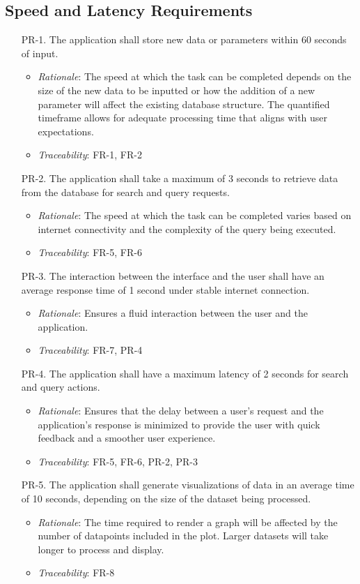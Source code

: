 \documentclass[12pt]{article}
\begin{document}
\subsection{Speed and Latency Requirements}
\begin{enumerate}
\item[PR-1.] The application shall store new data or parameters within 60 seconds of input.
  \begin{itemize}
    \item \textit{Rationale}: The speed at which the task can be completed depends on the size of the new data to be inputted or how the addition of a new parameter will affect the existing database structure. The quantified timeframe allows for adequate processing time that aligns with user expectations.
    \item \textit{Traceability}: FR-1, FR-2
  \end{itemize}
\item[PR-2.] The application shall take a maximum of 3 seconds to retrieve data from the database for search and query requests.
  \begin{itemize}
    \item \textit{Rationale}: The speed at which the task can be completed varies based on internet connectivity and the complexity of the query being executed.
    \item \textit{Traceability}: FR-5, FR-6
  \end{itemize}
\item[PR-3.] The interaction between the interface and the user shall have an average response time of 1 second under stable internet connection.
  \begin{itemize}
    \item \textit{Rationale}: Ensures a fluid interaction between the user and the application.
    \item \textit{Traceability}: FR-7, PR-4
  \end{itemize}
\item[PR-4.] The application shall have a maximum latency of 2 seconds for search and query actions.
  \begin{itemize}
    \item \textit{Rationale}: Ensures that the delay between a user's request and the application's response is minimized to provide the user with quick feedback and a smoother user experience.
    \item \textit{Traceability}: FR-5, FR-6, PR-2, PR-3
  \end{itemize}
\item[PR-5.] The application shall generate visualizations of data in an average time of 10 seconds, depending on the size of the dataset being processed.
  \begin{itemize}
    \item \textit{Rationale}: The time required to render a graph will be affected by the number of datapoints included in the plot. Larger datasets will take longer to process and display.
    \item \textit{Traceability}: FR-8
  \end{itemize}
\end{enumerate}
\end{document}
